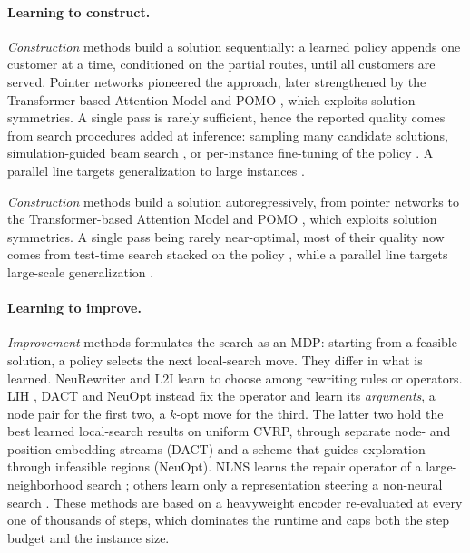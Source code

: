 \documentclass[letterpaper]{article} %
\begin{document}
\paragraph{Learning to construct.}
\emph{Construction} methods build a solution sequentially: a learned policy
appends one customer at a time, conditioned on the partial routes, until all
customers are served. Pointer networks \citep{vinyals_pointer_2015,nazari_reinforcement_2018}
pioneered the approach, later strengthened by the Transformer-based
Attention Model \citep{kool_attention_2019} and POMO \citep{kwon_pomo_2021},
which exploits solution symmetries. A single pass is
rarely sufficient, hence the reported quality comes
from search procedures added at inference: sampling many candidate
solutions, simulation-guided beam search \citep{choo_simulation-guided_2022},
or per-instance fine-tuning of the policy
\citep{hottung_efficient_2021,kim_learning_2021}. A parallel line targets
generalization to large instances \citep{drakulic_bq-nco_2023,luo_neural_2023}.



\emph{Construction} methods build a solution autoregressively, from pointer networks \citep{vinyals_pointer_2015,nazari_reinforcement_2018} to the Transformer-based Attention Model \citep{kool_attention_2019} and POMO \citep{kwon_pomo_2021}, which exploits solution symmetries. A single pass being rarely near-optimal, most of their quality now comes from test-time search stacked on the policy \citep{kim_learning_2021,hottung_efficient_2021,choo_simulation-guided_2022}, while a parallel line targets large-scale generalization \citep{drakulic_bq-nco_2023,luo_neural_2023}.




\paragraph{Learning to improve.}
\emph{Improvement} methods formulates the search as an MDP: starting from a
feasible solution, a policy selects the next local-search move. They differ
in what is learned. NeuRewriter \citep{chen_learning_2019} and L2I
\citep{lu_learning_2020} learn to choose among rewriting rules
or operators. LIH \citep{wu_learning_2022}, DACT \citep{ma_learning_2021}
and NeuOpt \citep{ma_learning_2023} instead fix the operator and learn its
\emph{arguments}, a node pair for the first two, a $k$-opt move for the
third. The latter two hold the best learned local-search results on uniform
CVRP, through separate node- and position-embedding streams (DACT) and a
scheme that guides exploration through infeasible regions (NeuOpt). NLNS \citep{hottung_neural_2022} learns the repair operator of a
large-neighborhood search \citep{garcia-torres_combining_2022,
bui_imitation_2023}; others learn only a representation steering a
non-neural search \citep{hottung_learning_2021,kool_deep_2022}. These methods are based on a heavyweight encoder re-evaluated at every one of thousands of steps, which dominates the runtime and caps both the step budget and the instance size.
\end{document}
